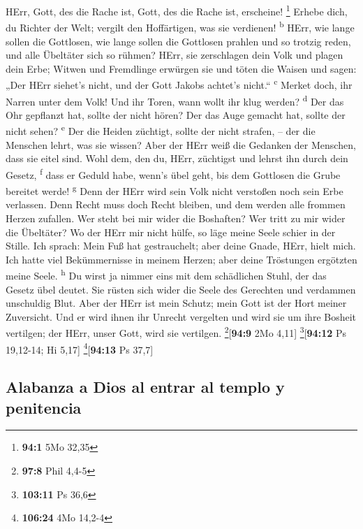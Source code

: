  HErr, Gott, des die Rache ist, Gott, des die Rache ist,
erscheine! \footnote{\textbf{94:1} 5Mo 32,35}  Erhebe
dich, du Richter der Welt; vergilt den Hoffärtigen, was sie verdienen!
\textsuperscript{b}  HErr, wie lange sollen die Gottlosen,
wie lange sollen die Gottlosen prahlen  und so trotzig
reden, und alle Übeltäter sich so rühmen?  HErr, sie
zerschlagen dein Volk und plagen dein Erbe;  Witwen und
Fremdlinge erwürgen sie und töten die Waisen  und sagen:
„Der HErr siehet's nicht, und der Gott Jakobs achtet's nicht.``
\textsuperscript{c}  Merket doch, ihr Narren unter dem
Volk! Und ihr Toren, wann wollt ihr klug werden? \textsuperscript{d}
 Der das Ohr gepflanzt hat, sollte der nicht hören? Der
das Auge gemacht hat, sollte der nicht sehen? \textsuperscript{e}
 Der die Heiden züchtigt, sollte der nicht strafen, --
der die Menschen lehrt, was sie wissen?  Aber der HErr
weiß die Gedanken der Menschen, dass sie eitel sind. 
Wohl dem, den du, HErr, züchtigst und lehrst ihn durch dein Gesetz,
\textsuperscript{f}  dass er Geduld habe, wenn's übel
geht, bis dem Gottlosen die Grube bereitet werde! \textsuperscript{g}
 Denn der HErr wird sein Volk nicht verstoßen noch sein
Erbe verlassen.  Denn Recht muss doch Recht bleiben, und
dem werden alle frommen Herzen zufallen.  Wer steht bei
mir wider die Boshaften? Wer tritt zu mir wider die Übeltäter?
 Wo der HErr mir nicht hülfe, so läge meine Seele schier
in der Stille.  Ich sprach: Mein Fuß hat gestrauchelt;
aber deine Gnade, HErr, hielt mich.  Ich hatte viel
Bekümmernisse in meinem Herzen; aber deine Tröstungen ergötzten meine
Seele. \textsuperscript{h}  Du wirst ja nimmer eins mit
dem schädlichen Stuhl, der das Gesetz übel deutet.  Sie
rüsten sich wider die Seele des Gerechten und verdammen unschuldig Blut.
 Aber der HErr ist mein Schutz; mein Gott ist der Hort
meiner Zuversicht.  Und er wird ihnen ihr Unrecht
vergelten und wird sie um ihre Bosheit vertilgen; der HErr, unser Gott,
wird sie vertilgen. \footnote{\textbf{97:8} Phil 4,4-5}{[}\textbf{94:9}
2Mo 4,11{]} \footnote{\textbf{103:11} Ps 36,6}{[}\textbf{94:12} Ps
19,12-14; Hi 5,17{]} \footnote{\textbf{106:24} 4Mo 14,2-4}{[}\textbf{94:13}
Ps 37,7{]}

\hypertarget{alabanza-a-dios-al-entrar-al-templo-y-penitencia}{%
\subsection{Alabanza a Dios al entrar al templo y
penitencia}\label{alabanza-a-dios-al-entrar-al-templo-y-penitencia}}

